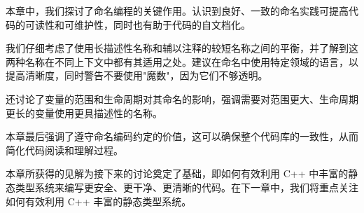 本章中，我们探讨了命名编程的关键作用。认识到良好、一致的命名实践可提高代码的可读性和可维护性，同时也有助于代码的自文档化。

我们仔细考虑了使用长描述性名称和辅以注释的较短名称之间的平衡，并了解到这两种名称在不同上下文中都有其适用之处。建议在命名中使用特定领域的语言，以提高清晰度，同时警告不要使用"魔数"，因为它们不够透明。

还讨论了变量的范围和生命周期对其命名的影响，强调需要对范围更大、生命周期更长的变量使用更具描述性的名称。

本章最后强调了遵守命名编码约定的价值，这可以确保整个代码库的一致性，从而简化代码阅读和理解过程。

本章所获得的见解为接下来的讨论奠定了基础，即如何有效利用 C++ 中丰富的静态类型系统来编写更安全、更干净、更清晰的代码。在下一章中，我们将重点关注如何有效利用 C++ 丰富的静态类型系统。














